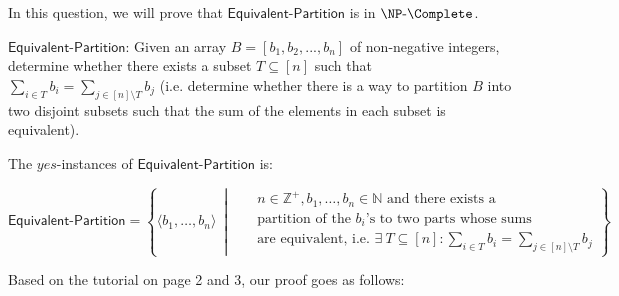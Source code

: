 In this question, we will prove that $\mathsf{Equivalent \text{-} Partition}$ is in $\NP \text{-} \Complete$.

$\mathsf{Equivalent \text{-} Partition}$: Given an array \(B=[b_1,b_2,...,b_n]\) of non-negative integers, determine whether there exists a subset $T \subseteq [n]$ such that $\sum_{i\in T} b_i = \sum_{j \in [n] \setminus T} b_j $ (i.e. determine whether there is a way to partition $B$ into two disjoint subsets such that the sum of the elements in each subset is equivalent).

The $yes$-instances of $\mathsf{Equivalent \text{-} Partition}$ is:

\begin{equation*}
\mathsf{Equivalent \text{-} Partition}= \left\{\langle{b_1, \ldots, b_{n}\rangle}~\middle|~~~\begin{aligned}
    &n\in \mathbb{Z}^+, b_1, \ldots, b_{n}\in \mathbb{N} \text{ and there exists a} \\ &\text{partition of the $b_i$'s to two parts whose sums}\\ &\text{are equivalent, i.e. }\exists{\:T\subseteq [n]}: \sum_{i\in T} b_i =  \sum_{j\in [n] \setminus T} b_j
\end{aligned}\right\}
\end{equation*}

Based on the tutorial on page 2 and 3, our proof goes as follows:

